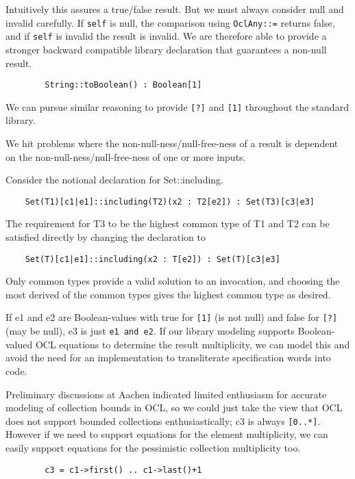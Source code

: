 \documentclass{llncs}
\begin{document}
Intuitively this assures a true/false result. But we must always consider null and invalid carefully. If \verb$self$ is null, the comparison using \verb$OclAny::=$ returns false, and if \verb$self$ is invalid the result is invalid. We are therefore able to provide a stronger backward compatible library declaration that guarantees a non-null result.
\begin{verbatim}
        String::toBoolean() : Boolean[1]
\end{verbatim}

We can pursue similar reasoning to provide \verb$[?]$ and \verb$[1]$ throughout the standard library.

We hit problems where the non-null-ness/null-free-ness of a result is dependent on the non-null-ness/null-free-ness of one or more inputs.

Consider the notional declaration for Set::including.
\begin{verbatim}
    Set(T1)[c1|e1]::including(T2)(x2 : T2[e2]) : Set(T3)[c3|e3]
\end{verbatim}

The requirement for T3 to be the highest common type of T1 and T2 can be satisfied directly by changing the declaration to
\begin{verbatim}
    Set(T)[c1|e1]::including(x2 : T[e2]) : Set(T)[c3|e3]
\end{verbatim}
Only common types provide a valid solution to an invocation, and choosing the most derived of the common types gives the highest common type as desired.

If e1 and e2 are Boolean-values with true for \verb$[1]$ (is not null) and false for \verb$[?]$ (may be null), e3 is just \verb$e1 and e2$. If our library modeling supports Boolean-valued OCL equations to determine the result multiplicity, we can model this and avoid the need for an implementation to transliterate specification words into code.

Preliminary discussions at Aachen\cite{aachen} indicated limited enthusiasm for accurate modeling of collection bounds in OCL, so we could just take the view that OCL does not support bounded collections enthusiastically; c3 is always \verb$[0..*]$. However if we need to support equations for the element multiplicity, we can easily support equations for the pessimistic collection multiplicity too. 

\begin{verbatim}
        c3 = c1->first() .. c1->last()+1
\end{verbatim}
\end{document}
